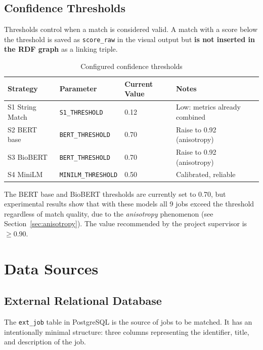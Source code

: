 \documentclass[12pt, a4paper]{report}
\begin{document}
\section{Confidence Thresholds}

Thresholds control when a match is considered valid. A
match with a score below the threshold is saved as
\texttt{score\_raw} in the visual output but \textbf{is not inserted
in the RDF graph} as a linking triple.

\begin{table}[H]
\centering
\begin{tabular}{llll}
\toprule
\textbf{Strategy} & \textbf{Parameter} & \textbf{Current Value} &
\textbf{Notes} \\
\midrule
S1 String Match  & \texttt{S1\_THRESHOLD}     & 0.12 & Low: metrics already combined \\
S2 BERT base     & \texttt{BERT\_THRESHOLD}   & 0.70 & Raise to 0.92 (anisotropy) \\
S3 BioBERT       & \texttt{BERT\_THRESHOLD}   & 0.70 & Raise to 0.92 (anisotropy) \\
S4 MiniLM        & \texttt{MINILM\_THRESHOLD} & 0.50 & Calibrated, reliable \\
\bottomrule
\end{tabular}
\caption{Configured confidence thresholds}
\end{table}

\begin{warnbox}
The BERT base and BioBERT thresholds are currently set to 0.70, but
experimental results show that with these models all 9 jobs
exceed the threshold regardless of match quality, due to
the \emph{anisotropy} phenomenon (see Section~\ref{sec:anisotropy}).
The value recommended by the project supervisor is $\geq 0.90$.
\end{warnbox}

% 
\chapter{Data Sources}
% 

\section{External Relational Database}

The \texttt{ext\_job} table in PostgreSQL is the source
of jobs to be matched. It has an intentionally minimal structure: three
columns representing the identifier, title, and description
of the job.
\end{document}
